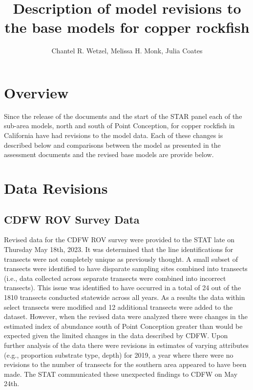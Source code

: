 \documentclass[
  letterpaper,
]{article}
\title{Description of model revisions to the base models for copper rockfish}
\author{Chantel R. Wetzel, Melissa H. Monk, Julia Coates}
\date{}
\begin{document}
\maketitle

{
\setcounter{tocdepth}{2}
\tableofcontents
}
\hypertarget{overview}{%
\section{Overview}\label{overview}}

Since the release of the documents and the start of the STAR panel each of the sub-area models, north and south of Point Conception, for copper rockfish in California have had revisions to the model data. Each of these changes is described below and comparisons between the model as presented in the assessment documents and the revised base models are provide below.

\hypertarget{data-revisions}{%
\section{Data Revisions}\label{data-revisions}}

\hypertarget{cdfw-rov-survey-data}{%
\subsection{CDFW ROV Survey Data}\label{cdfw-rov-survey-data}}

Revised data for the CDFW ROV survey were provided to the STAT late on Thursday May 18th, 2023. It was determined that the line identifications for transects were not completely unique as previously thought. A small subset of transects were identified to have disparate sampling sites combined into transects (i.e., data collected across separate transects were combined into incorrect transects). This issue was identified to have occurred in a total of 24 out of the 1810 transects conducted statewide across all years. As a results the data within select transects were modified and 12 additional transects were added to the dataset. However, when the revised data were analyzed there were changes in the estimated index of abundance south of Point Conception greater than would be expected given the limited changes in the data described by CDFW. Upon further analysis of the data there were revisions in estimates of varying attributes (e.g., proportion substrate type, depth) for 2019, a year where there were no revisions to the number of transects for the southern area appeared to have been made. The STAT communicated these unexpected findings to CDFW on May 24th.
\end{document}
